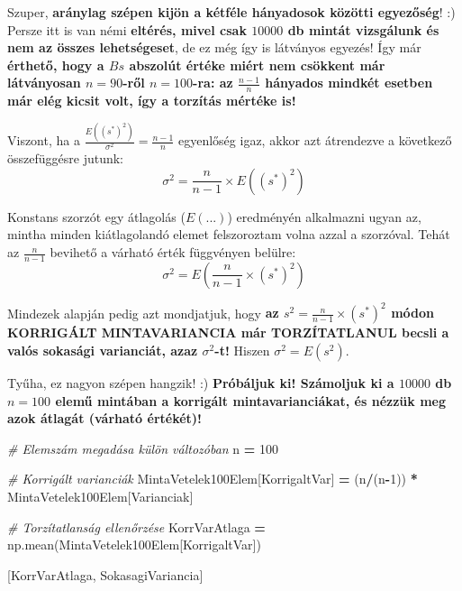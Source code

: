 \documentclass[
]{book}
\newenvironment{Shaded}{\begin{snugshade}}{\end{snugshade}}
\newcommand{\CommentTok}[1]{\textcolor[rgb]{0.56,0.35,0.01}{\textit{#1}}}
\newcommand{\DecValTok}[1]{\textcolor[rgb]{0.00,0.00,0.81}{#1}}
\newcommand{\NormalTok}[1]{#1}
\newcommand{\OperatorTok}[1]{\textcolor[rgb]{0.81,0.36,0.00}{\textbf{#1}}}
\newcommand{\StringTok}[1]{\textcolor[rgb]{0.31,0.60,0.02}{#1}}
\begin{document}
Szuper, \textbf{aránylag szépen kijön a kétféle hányadosok közötti egyezőség}! :) Persze itt is van némi \textbf{eltérés, mivel csak \(10000\) db mintát vizsgálunk és nem az összes lehetségeset}, de ez még így is látványos egyezés! Így már \textbf{érthető, hogy a \(Bs\) abszolút értéke miért nem csökkent már látványosan \(n=90\)-ről \(n=100\)-ra: az \(\frac{n-1}{n}\) hányados mindkét esetben már elég kicsit volt, így a torzítás mértéke is!}

Viszont, ha a \(\frac{E\left((s^*)^2\right)}{\sigma^2}=\frac{n-1}{n}\) egyenlőség igaz, akkor azt átrendezve a következő összefüggésre jutunk: \[\sigma^2=\frac{n}{n-1} \times E\left((s^*)^2\right)\]

Konstans szorzót egy átlagolás (\(E(...)\)) eredményén alkalmazni ugyan az, mintha minden kiátlagolandó elemet felszoroztam volna azzal a szorzóval. Tehát az \(\frac{n}{n-1}\) bevihető a várható érték függvényen belülre: \[\sigma^2= E\left(\frac{n}{n-1} \times (s^*)^2\right)\]

Mindezek alapján pedig azt mondjatjuk, hogy \textbf{az \(s^2=\frac{n}{n-1} \times (s^*)^2\) módon KORRIGÁLT MINTAVARIANCIA már TORZÍTATLANUL becsli a valós sokasági varianciát, azaz \(\sigma^2\)-t!} Hiszen \(\sigma^2= E\left(s^2\right)\).

Tyűha, ez nagyon szépen hangzik! :) \textbf{Próbáljuk ki! Számoljuk ki a \(10000\) db \(n=100\) elemű mintában a korrigált mintavarianciákat, és nézzük meg azok átlagát (várható értékét)!}

\begin{Shaded}
\begin{Highlighting}[]
\CommentTok{\# Elemszám megadása külön változóban}
\NormalTok{n }\OperatorTok{=} \DecValTok{100}

\CommentTok{\# Korrigált varianciák}
\NormalTok{MintaVetelek100Elem[}\StringTok{\textquotesingle{}KorrigaltVar\textquotesingle{}}\NormalTok{] }\OperatorTok{=}\NormalTok{ (n}\OperatorTok{/}\NormalTok{(n}\OperatorTok{{-}}\DecValTok{1}\NormalTok{)) }\OperatorTok{*}\NormalTok{ MintaVetelek100Elem[}\StringTok{\textquotesingle{}Varianciak\textquotesingle{}}\NormalTok{]}

\CommentTok{\# Torzítatlanság ellenőrzése}
\NormalTok{KorrVarAtlaga }\OperatorTok{=}\NormalTok{ np.mean(MintaVetelek100Elem[}\StringTok{\textquotesingle{}KorrigaltVar\textquotesingle{}}\NormalTok{])}

\NormalTok{[KorrVarAtlaga, SokasagiVariancia]}
\end{Highlighting}
\end{Shaded}
\end{document}
